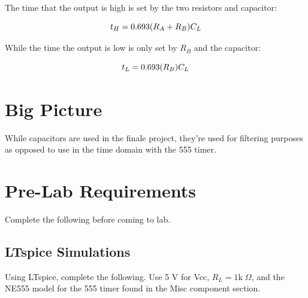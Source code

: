 The time that the output is high is set by the two resistors and capacitor:

\begin{equation}
	\centering
	t_H = 0.693(R_A + R_B)C_L
\end{equation}

\noindent While the time the output is low is only set by $R_B$ and the capacitor:

\begin{equation}
	\centering
	t_L = 0.693(R_B)C_L
\end{equation}

\section{Big Picture}

While capacitors are used in the finale project, they're used for filtering purposes as opposed to use in the time domain with the 555 timer. 

\section{Pre-Lab Requirements}

Complete the following before coming to lab. 

\subsection{LTspice Simulations} \label{ssec:sims}

Using LTspice, complete the following. Use 5 V for Vcc, $R_L = 1\mathrm{k}\;\Omega$, and the NE555 model for the 555 timer found in the Misc component section. 

